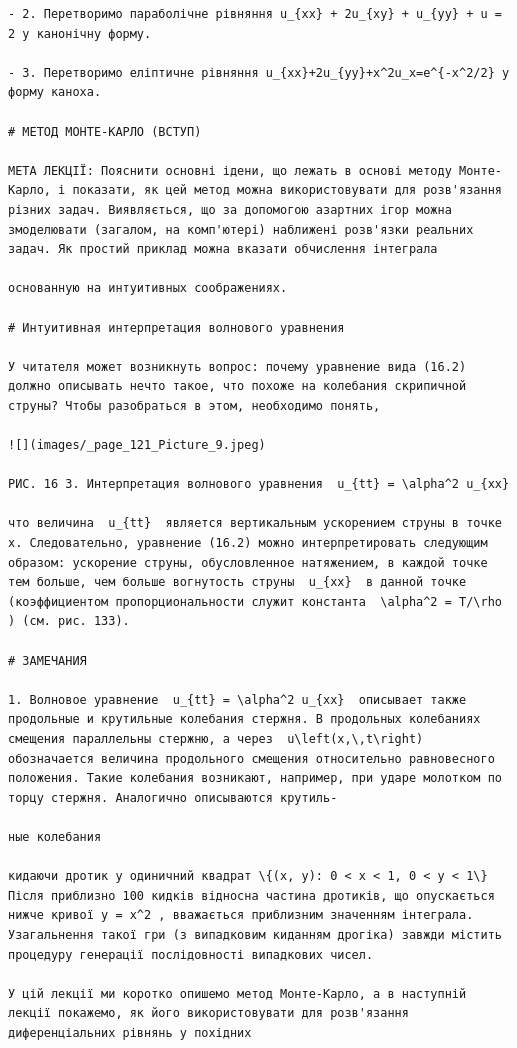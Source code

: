 \documentclass[
  ukrainian,
]{article}
\begin{document}
\begin{verbatim}
- 2. Перетворимо параболічне рівняння u_{xx} + 2u_{xy} + u_{yy} + u = 2 у канонічну форму.

- 3. Перетворимо еліптичне рівняння u_{xx}+2u_{yy}+x^2u_x=e^{-x^2/2} у форму каноха.

# МЕТОД МОНТЕ-КАРЛО (ВСТУП)

МЕТА ЛЕКЦІЇ: Пояснити основні ідени, що лежать в основі методу Монте-Карло, і показати, як цей метод можна використовувати для розв'язання різних задач. Виявляється, що за допомогою азартних ігор можна змоделювати (загалом, на комп'ютері) наближені розв'язки реальних задач. Як простий приклад можна вказати обчислення інтеграла

основанную на интуитивных соображениях.

# Интуитивная интерпретация волнового уравнения

У читателя может возникнуть вопрос: почему уравнение вида (16.2) должно описывать нечто такое, что похоже на колебания скрипичной струны? Чтобы разобраться в этом, необходимо понять,

![](images/_page_121_Picture_9.jpeg)

РИС. 16 3. Интерпретация волнового уравнения  u_{tt} = \alpha^2 u_{xx} 

что величина  u_{tt}  является вертикальным ускорением струны в точке x. Следовательно, уравнение (16.2) можно интерпретировать следующим образом: ускорение струны, обусловленное натяжением, в каждой точке тем больше, чем больше вогнутость струны  u_{xx}  в данной точке (коэффициентом пропорциональности служит константа  \alpha^2 = T/\rho ) (см. рис. 133).

# ЗАМЕЧАНИЯ

1. Волновое уравнение  u_{tt} = \alpha^2 u_{xx}  описывает также продольные и крутильные колебания стержня. В продольных колебаниях смещения параллельны стержню, а через  u\left(x,\,t\right)  обозначается величина продольного смещения относительно равновесного положения. Такие колебания возникают, например, при ударе молотком по торцу стержня. Аналогично описываются крутиль-

ные колебания

кидаючи дротик у одиничний квадрат \{(x, y): 0 < x < 1, 0 < y < 1\} Після приблизно 100 кидків відносна частина дротиків, що опускається нижче кривої y = x^2 , вважається приблизним значенням інтеграла. Узагальнення такої гри (з випадковим киданням дрогіка) завжди містить процедуру генерації послідовності випадкових чисел.

У цій лекції ми коротко опишемо метод Монте-Карло, а в наступній лекції покажемо, як його використовувати для розв'язання диференціальних рівнянь у похідних


\end{verbatim}
\end{document}
